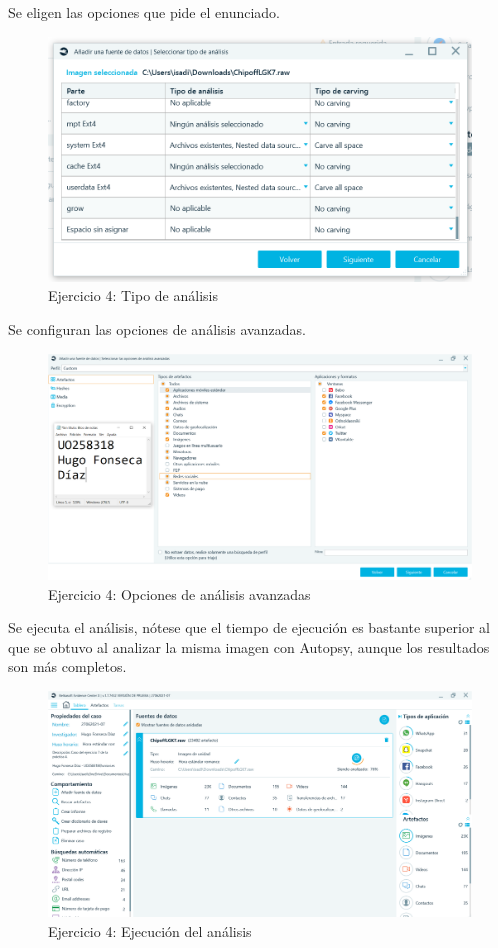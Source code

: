 \documentclass[11pt]{article}
\begin{document}
Se eligen las opciones que pide el enunciado.

\begin{figure}[H]
    \caption{Ejercicio 4: Tipo de análisis}
    \centering
    \includegraphics[scale=0.7]{p04/e7-3.PNG}
\end{figure}

Se configuran las opciones de análisis avanzadas.

\begin{figure}[H]
    \caption{Ejercicio 4: Opciones de análisis avanzadas}
    \centering
    \includegraphics[scale=0.4]{p04/e7-4.PNG}
\end{figure}

Se ejecuta el análisis, nótese que el tiempo de ejecución es bastante superior al que se obtuvo al analizar la misma imagen con Autopsy, aunque los resultados son más completos.

\begin{figure}[H]
    \caption{Ejercicio 4: Ejecución del análisis}
    \centering
    \includegraphics[scale=0.4]{p04/e7-6.PNG}
\end{figure}
\end{document}
